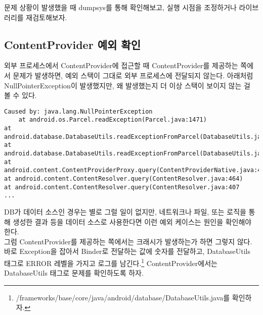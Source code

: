 문제 상황이 발생했을 때 dumpsys를 통해 확인해보고, 실행 시점을 조정하거나 라이브러리를 재검토해보자.

\subsection{ContentProvider 예외 확인}
외부 프로세스에서 ContentProvider에 접근할 때 ContentProvider를 제공하는 쪽에서 문제가 발생하면, 예외 스택이 그대로 외부 프로세스에 전달되지 않는다.
아래처럼 NullPointerException이 발생했지만, 왜 발생했는지 더 이상 스택이 보이지 않는 걸 볼 수 있다.
\begin{lstlisting}[frame=single] 
Caused by: java.lang.NullPointerException 
	at android.os.Parcel.readException(Parcel.java:1471) 
at android.database.DatabaseUtils.readExceptionFromParcel(DatabaseUtils.java:185) 
at android.database.DatabaseUtils.readExceptionFromParcel(DatabaseUtils.java:137) 
at android.content.ContentProviderProxy.query(ContentProviderNative.java:413) 
at android.content.ContentResolver.query(ContentResolver.java:464) 
at android.content.ContentResolver.query(ContentResolver.java:407
...
\end{lstlisting}
DB가 데이터 소스인 경우는 별로 그럴 일이 없지만, 네트워크나 파일, 또는 로직을 통해 생성한 결과 등을 데이터 소스로 사용한다면 이런 예외 케이스는 원인을 확인해야 한다.\\

그럼 ContentProvider를 제공하는 쪽에서는 크래시가 발생하는가 하면 그렇지 않다. 바로 Exception을 잡아서 Binder로 전달하는 값에 숫자를 전달하고, DatabaseUtils 태그로 ERROR 레벨을 가지고 로그를 남긴다.\footnote{/frameworks/base/core/java/android/database/DatabaseUtils.java를 확인하자.}
ContentProvider에서는 DatabaseUtils 태그로 문제를 확인하도록 하자.

